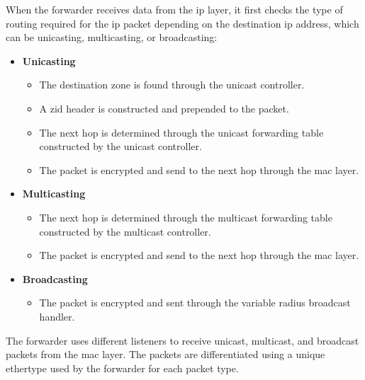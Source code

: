 When the forwarder receives data from the \acrshort{ip} layer, it first checks the type of routing required for the \acrshort{ip} packet depending on the destination \acrshort{ip} address, which can be unicasting, multicasting, or broadcasting:
\begin{itemize}[itemsep=1pt, topsep=5pt]
    \item \textbf{Unicasting}
    \begin{itemize}[itemsep=1pt, topsep=5pt]
        \item The destination zone is found through the unicast controller.
        \item A \acrshort{zid} header is constructed and prepended to the packet.
        \item The next hop is determined through the unicast forwarding table constructed by the unicast controller.
        \item The packet is encrypted and send to the next hop through the \acrshort{mac} layer.
    \end{itemize}
    \item \textbf{Multicasting}
    \begin{itemize}[itemsep=1pt, topsep=5pt]
        \item The next hop is determined through the multicast forwarding table constructed by the multicast controller.
        \item The packet is encrypted and send to the next hop through the \acrshort{mac} layer.
    \end{itemize}
    \item \textbf{Broadcasting}
    \begin{itemize}[itemsep=1pt, topsep=5pt]
        \item The packet is encrypted and sent through the variable radius broadcast handler.
    \end{itemize}
\end{itemize}

The forwarder uses different listeners to receive unicast, multicast, and broadcast packets from the \acrshort{mac} layer. The packets are differentiated using a unique ethertype used by the forwarder for each packet type. 

